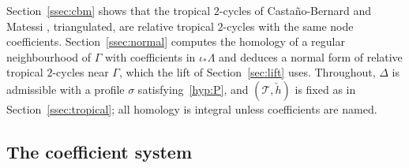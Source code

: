 Section~\ref{ssec:cbm} shows that the tropical $2$-cycles of Casta\~no-Bernard and Matessi \cite[Def.~7.2]{CBM},
triangulated, are relative tropical $2$-cycles with the same node coefficients. Section~\ref{ssec:normal} computes the
homology of a regular neighbourhood of $\Gamma$ with coefficients in $\iota_*\Lambda$ and deduces a normal form of
relative tropical $2$-cycles near $\Gamma$, which the lift of Section~\ref{sec:lift} uses. Throughout, $\Delta$ is
admissible with a profile $\sigma$ satisfying~\ref{hyp:P}, and $(\mathcal T,\check h)$ is fixed as in
Section~\ref{ssec:tropical}; all homology is integral unless coefficients are named.

\subsection{The coefficient system}\label{ssec:coef}

